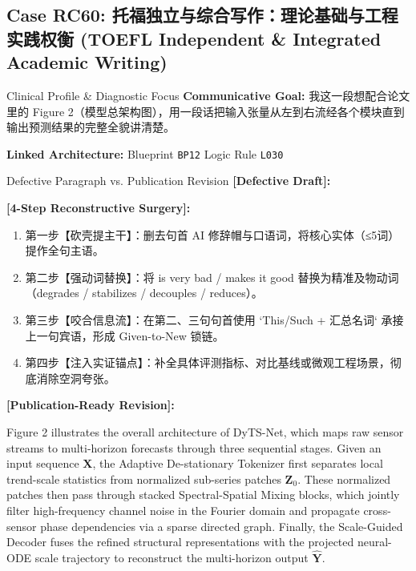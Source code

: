 \subsection{Case RC60: 托福独立与综合写作：理论基础与工程实践权衡 (TOEFL Independent \& Integrated Academic Writing)}\label{case:RC60}
\begin{ConceptBox}{Clinical Profile \& Diagnostic Focus}
\textbf{Communicative Goal:} 我这一段想配合论文里的 Figure 2（模型总架构图），用一段话把输入张量从左到右流经各个模块直到输出预测结果的完整全貌讲清楚。\par
\textbf{Linked Architecture:} Blueprint \texttt{BP12} \enspace\textbar\enspace Logic Rule \texttt{L030}
\end{ConceptBox}
\begin{ExampleBox}{Defective Paragraph vs. Publication Revision}
\textbf{\color{TargetHighlight}[Defective Draft]:}\par
{}\par\vspace{6pt}
\textbf{\color{AcadForest}[4-Step Reconstructive Surgery]:}
\begin{enumerate}[label=\textbf{\color{AcadNavy}Step \arabic*:}, leftmargin=2em]
  \item 第一步【砍壳提主干】：删去句首 AI 修辞帽与口语词，将核心实体（≤5词）提作全句主语。
  \item 第二步【强动词替换】：将 is very bad / makes it good 替换为精准及物动词（degrades / stabilizes / decouples / reduces）。
  \item 第三步【咬合信息流】：在第二、三句句首使用 `This/Such + 汇总名词` 承接上一句宾语，形成 Given-to-New 锁链。
  \item 第四步【注入实证锚点】：补全具体评测指标、对比基线或微观工程场景，彻底消除空洞夸张。
\end{enumerate}\vspace{4pt}
\textbf{\color{AcadNavy}[Publication-Ready Revision]:}\par
Figure 2 illustrates the overall architecture of DyTS-Net, which maps raw sensor streams to multi-horizon forecasts through three sequential stages. Given an input sequence $\mathbf{X}$, the Adaptive De-stationary Tokenizer first separates local trend-scale statistics from normalized sub-series patches $\mathbf{Z}_0$. These normalized patches then pass through stacked Spectral-Spatial Mixing blocks, which jointly filter high-frequency channel noise in the Fourier domain and propagate cross-sensor phase dependencies via a sparse directed graph. Finally, the Scale-Guided Decoder fuses the refined structural representations with the projected neural-ODE scale trajectory to reconstruct the multi-horizon output $\hat{\mathbf{Y}}$.
\end{ExampleBox}
